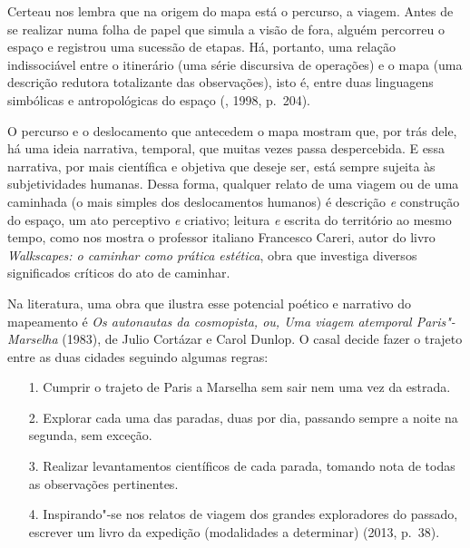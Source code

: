 Certeau nos lembra que na origem do mapa está o percurso, a viagem.
Antes de se realizar numa folha de papel que simula a visão de fora,
alguém percorreu o espaço e registrou uma sucessão de etapas. Há,
portanto, uma relação indissociável entre o itinerário (uma série
discursiva de operações) e o mapa (uma descrição redutora totalizante
das observações), isto é, entre duas linguagens simbólicas e
antropológicas do espaço (, 1998, p.~204).

O percurso e o deslocamento que antecedem o mapa mostram que, por trás
dele, há uma ideia narrativa, temporal, que muitas vezes passa
despercebida. E essa narrativa, por mais científica e objetiva que
deseje ser, está sempre sujeita às subjetividades humanas. Dessa forma,
qualquer relato de uma viagem ou de uma caminhada (o mais simples dos
deslocamentos humanos) é descrição \emph{e} construção do espaço, um ato
perceptivo \emph{e} criativo; leitura \emph{e} escrita do território ao
mesmo tempo, como nos mostra o professor italiano Francesco Careri,
autor do livro \emph{Walkscapes: o caminhar como prática
estética}, obra que investiga diversos significados críticos do ato de
caminhar.

Na literatura, uma obra que ilustra esse potencial poético e narrativo
do mapeamento é \emph{Os autonautas da cosmopista, ou, Uma viagem
atemporal Paris"-Marselha} (1983), de Julio Cortázar e Carol Dunlop. O
casal decide fazer o trajeto entre as duas cidades seguindo algumas
regras:

\begin{enumerate}
\item[1.] Cumprir o trajeto de Paris a Marselha sem sair nem uma vez da
estrada.

\item[2.] Explorar cada uma das paradas, duas por dia, passando sempre a noite
na segunda, sem exceção.

\item[3.] Realizar levantamentos científicos de cada parada, tomando nota de
todas as observações pertinentes.

\item[4.] Inspirando"-se nos relatos de viagem dos grandes exploradores do
passado, escrever um livro da expedição (modalidades a determinar)
(2013, p.~38).
\end{enumerate}

